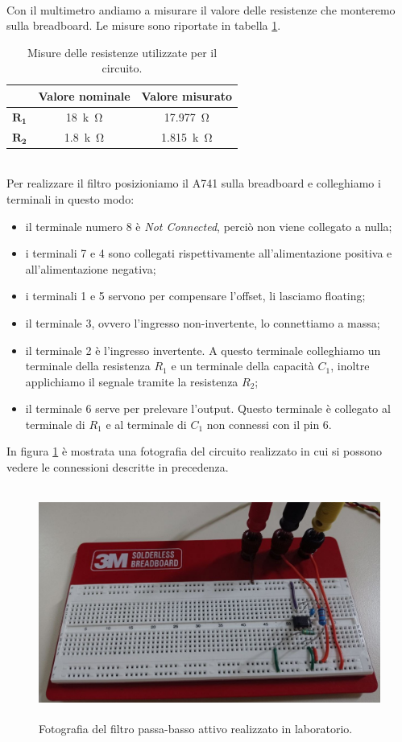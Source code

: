 \documentclass{report}
\begin{document}
\\Con il multimetro andiamo a misurare il valore delle resistenze che monteremo sulla breadboard. Le misure sono riportate in tabella \ref{table:mis_res}.
\begin{table}[h]
	\centering
	\begin{tabular}{|c|c|c|}
	\cline{2-3} 
	\multicolumn{1}{c|}{} & \textbf{Valore nominale} & \textbf{Valore misurato}\\ 
		\hline
		$\mathbf{R_1}$ & \SI{18}{k\ohm} & \SI{17.977}{\ohm} \\ 
		\hline
		$\mathbf{R_2}$& \SI{1.8}{k\ohm} & \SI{1.815}{k\ohm} \\ 
		\hline
	\end{tabular}
\caption{Misure delle resistenze utilizzate per il circuito.}
\label{table:mis_res}
\end{table}
\\Per realizzare il filtro posizioniamo il \textmu A741 sulla breadboard e colleghiamo i terminali in questo modo:
\begin{itemize}
\item il terminale numero 8 è \textit{Not Connected}, perciò non viene collegato a nulla;
\item i terminali 7 e 4 sono collegati rispettivamente all'alimentazione positiva e all'alimentazione negativa;
\item i terminali 1 e 5 servono per compensare l'offset, li lasciamo floating;
\item il terminale 3, ovvero l'ingresso non-invertente, lo connettiamo a massa;
\item il terminale 2 è l'ingresso invertente. A questo terminale colleghiamo un terminale della resistenza $R_1$ e un terminale della capacità $C_1$, inoltre applichiamo il segnale tramite la resistenza $R_2$; 
\item il terminale 6 serve per prelevare l'output. Questo terminale è collegato al terminale di $R_1$ e al terminale di $C_1$ non connessi con il pin 6.
\end{itemize}
In figura \ref{figura:foto_circ} è mostrata una fotografia del circuito realizzato in cui si possono vedere le connessioni descritte in precedenza.
\begin{figure}[h!]
\centering
\includegraphics[height=7.6cm]{immagini/circuito}
\caption{Fotografia del filtro passa-basso attivo realizzato in laboratorio.}
\label{figura:foto_circ}
\end{figure}
\end{document}
